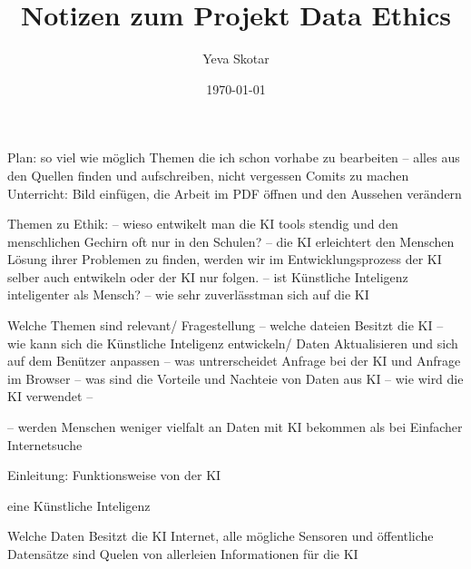 \documentclass{article}
\title{Notizen zum Projekt Data Ethics}
\author{Yeva Skotar}
\date{\today}
\begin{document}
\maketitle


\tableofcontents



Plan:
so viel wie möglich Themen die ich schon vorhabe zu bearbeiten -- alles aus den Quellen finden und aufschreiben, 
nicht vergessen Comits zu machen 
Unterricht:
Bild einfügen, die Arbeit im PDF öffnen und den Aussehen verändern 

Themen zu Ethik:
-- wieso entwikelt man die KI tools stendig und den menschlichen Gechirn oft nur in den Schulen?
-- die KI erleichtert den Menschen Lösung ihrer Problemen zu finden, werden wir im Entwicklungsprozess der KI 
selber auch entwikeln oder der KI nur folgen.
-- ist Künstliche Inteligenz inteligenter als Mensch?
-- wie sehr zuverlässtman sich auf die KI

Welche Themen sind relevant/ Fragestellung
-- welche dateien Besitzt die KI
-- wie kann sich die Künstliche Inteligenz entwickeln/ Daten Aktualisieren und sich auf dem Benützer anpassen 
-- was untrerscheidet Anfrage bei der KI und Anfrage im Browser 
-- was sind die Vorteile und Nachteie von Daten aus KI 
-- wie wird die KI verwendet
--  

-- werden Menschen weniger vielfalt an Daten mit KI bekommen als bei Einfacher Internetsuche 

Einleitung: Funktionsweise von der KI 


eine Künstliche Inteligenz 

Welche Daten Besitzt die KI 
Internet, alle mögliche Sensoren und öffentliche Datensätze sind Quelen von allerleien Informationen 
für die KI 
\end{document}
